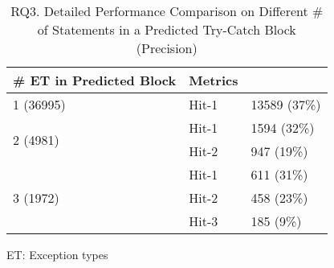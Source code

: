 \begin{table}[t]
	\caption{RQ3. Detailed Performance Comparison on Different \# of Statements in a Predicted Try-Catch Block (Precision)}
	\vspace{-10pt}
	\tabcolsep 2pt
	{\small
		\begin{center}
			\renewcommand{\arraystretch}{1}
			\begin{tabular}{p{3.5cm}<{\centering}|p{2cm}<{\centering}|p{2.5cm}<{\centering}}
				\hline
				\# ET in Predicted Block & Metrics & {\textsc{\tool}\xspace} \\
				\hline
				\multirow{1}{*}{1 (36995)}   & Hit-1  & 13589 (37\%) \\
				\hline
				\multirow{2}{*}{2 (4981)}  & Hit-1   & 1594 (32\%) \\
				& Hit-2       						& 947 (19\%) \\
				\hline
				\multirow{3}{*}{3 (1972)}  & Hit-1    & 611 (31\%) \\
				& Hit-2         					& 458 (23\%)\\
				& Hit-3         				  	& 185 (9\%) \\
				\hline
			\end{tabular}
		ET: Exception types
			\label{RQ3_results_2}
		\end{center}
	}
\end{table}